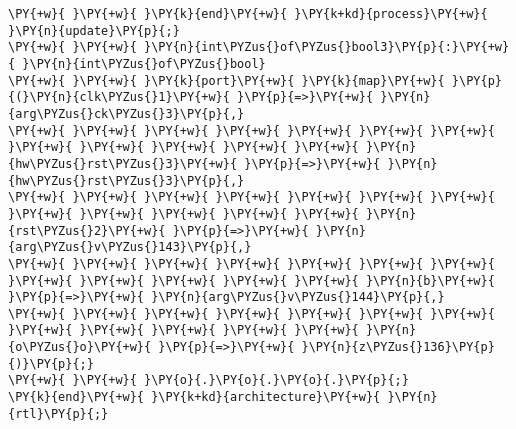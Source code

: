 \begin{Verbatim}[commandchars=\\\{\}]
\PY{+w}{ }\PY{+w}{ }\PY{k}{end}\PY{+w}{ }\PY{k+kd}{process}\PY{+w}{ }\PY{n}{update}\PY{p}{;}
\PY{+w}{ }\PY{+w}{ }\PY{n}{int\PYZus{}of\PYZus{}bool3}\PY{p}{:}\PY{+w}{ }\PY{n}{int\PYZus{}of\PYZus{}bool}
\PY{+w}{ }\PY{+w}{ }\PY{k}{port}\PY{+w}{ }\PY{k}{map}\PY{+w}{ }\PY{p}{(}\PY{n}{clk\PYZus{}1}\PY{+w}{ }\PY{p}{=>}\PY{+w}{ }\PY{n}{arg\PYZus{}ck\PYZus{}3}\PY{p}{,}
\PY{+w}{ }\PY{+w}{ }\PY{+w}{ }\PY{+w}{ }\PY{+w}{ }\PY{+w}{ }\PY{+w}{ }\PY{+w}{ }\PY{+w}{ }\PY{+w}{ }\PY{+w}{ }\PY{+w}{ }\PY{n}{hw\PYZus{}rst\PYZus{}3}\PY{+w}{ }\PY{p}{=>}\PY{+w}{ }\PY{n}{hw\PYZus{}rst\PYZus{}3}\PY{p}{,}
\PY{+w}{ }\PY{+w}{ }\PY{+w}{ }\PY{+w}{ }\PY{+w}{ }\PY{+w}{ }\PY{+w}{ }\PY{+w}{ }\PY{+w}{ }\PY{+w}{ }\PY{+w}{ }\PY{+w}{ }\PY{n}{rst\PYZus{}2}\PY{+w}{ }\PY{p}{=>}\PY{+w}{ }\PY{n}{arg\PYZus{}v\PYZus{}143}\PY{p}{,}
\PY{+w}{ }\PY{+w}{ }\PY{+w}{ }\PY{+w}{ }\PY{+w}{ }\PY{+w}{ }\PY{+w}{ }\PY{+w}{ }\PY{+w}{ }\PY{+w}{ }\PY{+w}{ }\PY{+w}{ }\PY{n}{b}\PY{+w}{ }\PY{p}{=>}\PY{+w}{ }\PY{n}{arg\PYZus{}v\PYZus{}144}\PY{p}{,}
\PY{+w}{ }\PY{+w}{ }\PY{+w}{ }\PY{+w}{ }\PY{+w}{ }\PY{+w}{ }\PY{+w}{ }\PY{+w}{ }\PY{+w}{ }\PY{+w}{ }\PY{+w}{ }\PY{+w}{ }\PY{n}{o\PYZus{}o}\PY{+w}{ }\PY{p}{=>}\PY{+w}{ }\PY{n}{z\PYZus{}136}\PY{p}{)}\PY{p}{;}
\PY{+w}{ }\PY{+w}{ }\PY{o}{.}\PY{o}{.}\PY{o}{.}\PY{p}{;}
\PY{k}{end}\PY{+w}{ }\PY{k+kd}{architecture}\PY{+w}{ }\PY{n}{rtl}\PY{p}{;}
\end{Verbatim}
